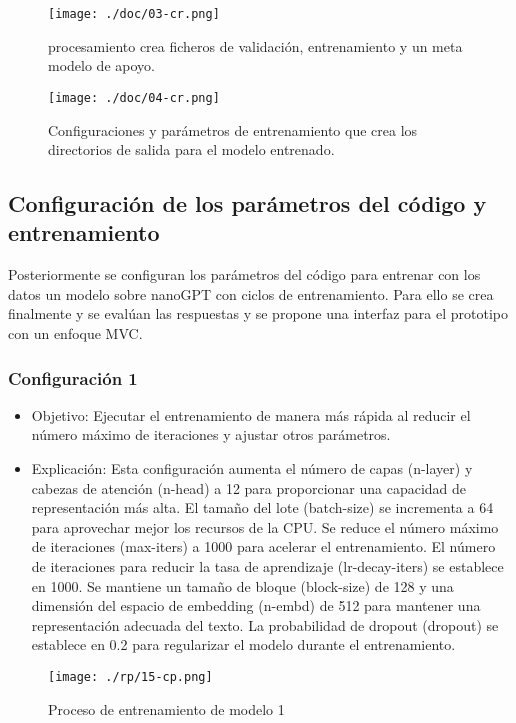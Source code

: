 \begin{figure}[H]
   \centering %
       \texttt{[image: ./doc/03-cr.png]} 
   \caption{procesamiento crea  ficheros de validación, entrenamiento y un meta modelo de apoyo.  \cite{}}
  \label{figure:Etapa de encoder}  %
\end{figure}
\begin{figure}[H]
   \centering %
       \texttt{[image: ./doc/04-cr.png]} 
   \caption{Configuraciones y parámetros de entrenamiento que crea los directorios de salida para el modelo entrenado.  \cite{}}
  \label{figure:Configuraciónes de parámetros}  %
\end{figure}
\subsection{Configuración de los parámetros del código y entrenamiento}\label{section:Configuración de los parámetros del código} 
Posteriormente se configuran los parámetros del código para entrenar con los datos un modelo sobre nanoGPT con ciclos de entrenamiento. Para ello se crea finalmente y se evalúan las respuestas y se propone una interfaz para el prototipo con un enfoque MVC.
\subsubsection{Configuración 1}\label{section:Configuración de los parámetros del código} 
\begin{itemize}
        \item   Objetivo: Ejecutar el entrenamiento de manera más rápida al reducir el número máximo de iteraciones y ajustar otros parámetros.
        \item   Explicación: Esta configuración aumenta el número de capas (n-layer) y cabezas de atención (n-head) a 12 para proporcionar una capacidad de representación más alta. El tamaño del lote (batch-size) se incrementa a 64 para aprovechar mejor los recursos de la CPU. Se reduce el número máximo de iteraciones (max-iters) a 1000 para acelerar el entrenamiento. El número de iteraciones para reducir la tasa de aprendizaje (lr-decay-iters) se establece en 1000. Se mantiene un tamaño de bloque (block-size) de 128 y una dimensión del espacio de embedding (n-embd) de 512 para mantener una representación adecuada del texto. La probabilidad de dropout (dropout) se establece en 0.2 para regularizar el modelo durante el entrenamiento.
    \end{itemize}
    \begin{figure}[H]
   \centering %
       \texttt{[image: ./rp/15-cp.png]} 
   \caption{Proceso de entrenamiento de modelo 1\cite{}}
  \label{figure:Resultado 1}  %
\end{figure}
